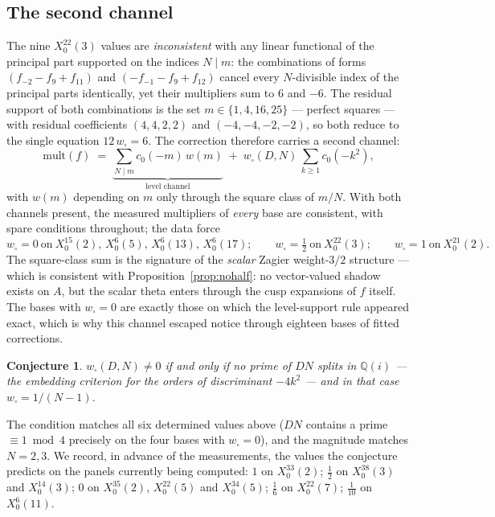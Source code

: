 \documentclass[11pt,reqno]{amsart}
\theoremstyle{plain}
\newtheorem{conjecture}[theorem]{Conjecture}
\theoremstyle{definition}
\newcommand{\Q}{\mathbb{Q}}
\begin{document}
\subsection*{The second channel}
The nine $X_0^{22}(3)$ values are \emph{inconsistent} with any linear functional of the
principal part supported on the indices $N\mid m$: the combinations of forms
$(f_{-2}-f_9+f_{11})$ and $(-f_{-1}-f_9+f_{12})$ cancel every $N$-divisible index of the
principal parts identically, yet their multipliers sum to $6$ and $-6$. The residual support of
both combinations is the set $m\in\{1,4,16,25\}$ --- perfect squares --- with residual
coefficients $(4,4,2,2)$ and $(-4,-4,-2,-2)$, so both reduce to the single equation
$12\,w_{\square}=6$. The correction therefore carries a second channel:
\begin{equation}\label{eq:twochannel}
  \mathrm{mult}(f)\;=\;\underbrace{\sum_{N\mid m}c_0(-m)\,w(m)}_{\text{level channel}}
  \;+\;w_{\square}(D,N)\,\sum_{k\ge1}c_0(-k^2),
\end{equation}
with $w(m)$ depending on $m$ only through the square class of $m/N$. With both channels present,
the measured multipliers of \emph{every} base are consistent, with spare conditions throughout;
the data force
\[
w_{\square}=0\ \text{on}\ X_0^{15}(2),\,X_0^{6}(5),\,X_0^{6}(13),\,X_0^{6}(17);\qquad
w_{\square}=\tfrac12\ \text{on}\ X_0^{22}(3);\qquad
w_{\square}=1\ \text{on}\ X_0^{21}(2).
\]
The square-class sum is the signature of the \emph{scalar} Zagier weight-$3/2$ structure ---
which is consistent with Proposition~\ref{prop:nohalf}: no vector-valued shadow exists on $A$,
but the scalar theta enters through the cusp expansions of $f$ itself. The bases with
$w_{\square}=0$ are exactly those on which the level-support rule appeared exact, which is why
this channel escaped notice through eighteen bases of fitted corrections.

\begin{conjecture}\label{conj:sq}
$w_{\square}(D,N)\neq0$ if and only if no prime of $DN$ splits in $\Q(i)$ --- the embedding
criterion for the orders of discriminant $-4k^2$ --- and in that case
$w_{\square}=1/(N-1)$.
\end{conjecture}

The condition matches all six determined values above ($DN$ contains a prime
$\equiv1\bmod4$ precisely on the four bases with $w_{\square}=0$), and the magnitude matches
$N=2,3$. We record, in advance of the measurements, the values the conjecture predicts on the
panels currently being computed: $1$ on $X_0^{33}(2)$; $\tfrac12$ on $X_0^{38}(3)$ and
$X_0^{14}(3)$; $0$ on $X_0^{35}(2)$, $X_0^{22}(5)$ and $X_0^{34}(5)$; $\tfrac16$ on
$X_0^{22}(7)$; $\tfrac1{10}$ on $X_0^{6}(11)$.
\end{document}
